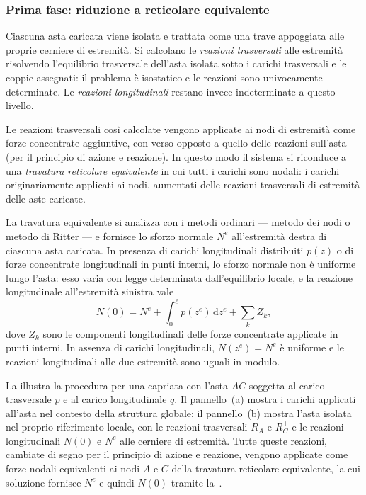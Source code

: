 \subsubsection{Prima fase: riduzione a reticolare equivalente}
\label{subsec:fase1_reticolare}

Ciascuna asta caricata viene isolata e trattata
come una trave appoggiata alle proprie cerniere di
estremità. Si calcolano le \emph{reazioni trasversali}
alle estremità risolvendo l'equilibrio trasversale
dell'asta isolata sotto i carichi trasversali e le
coppie assegnati: il problema è isostatico e le
reazioni sono univocamente determinate. Le
\emph{reazioni longitudinali} restano invece
indeterminate a questo livello.

Le reazioni trasversali così calcolate vengono
applicate ai nodi di estremità come forze concentrate
aggiuntive, con verso opposto a quello delle reazioni
sull'asta (per il principio di azione e reazione).
In questo modo il sistema si riconduce a una
\emph{travatura reticolare equivalente} in cui tutti
i carichi sono nodali: i carichi originariamente
applicati ai nodi, aumentati delle reazioni
trasversali di estremità delle aste caricate.

La travatura equivalente si analizza con i metodi
ordinari --- metodo dei nodi o metodo di Ritter ---
e fornisce lo sforzo normale $N^e$ all'estremità
destra di ciascuna asta caricata. In presenza di
carichi longitudinali distribuiti $p(z)$ o di
forze concentrate longitudinali in punti interni,
lo sforzo normale non è uniforme lungo l'asta:
esso varia con legge determinata dall'equilibrio
locale, e la reazione longitudinale all'estremità
sinistra vale
\begin{equation}\label{eq:reazione_long_sinistra}
	N(0) = N^e + \int_0^\ell p(z^e)\,\mathrm{d}z^e
	+ \sum_k Z_k,
\end{equation}
dove $Z_k$ sono le componenti longitudinali
delle forze concentrate applicate in punti interni.
In assenza di carichi longitudinali, $N(z^e) = N^e$
è uniforme e le reazioni longitudinali alle due
estremità sono uguali in modulo.

La  illustra la procedura
per una capriata con l'asta $AC$ soggetta al carico
trasversale $p$ e al carico longitudinale $q$.
Il pannello~(a) mostra i carichi applicati all'asta
nel contesto della struttura globale; il pannello~(b)
mostra l'asta isolata nel proprio riferimento locale,
con le reazioni trasversali $R_A^\perp$ e $R_C^\perp$
e le reazioni longitudinali $N(0)$ e $N^e$ alle
cerniere di estremità. Tutte queste reazioni,
cambiate di segno per il principio di azione e
reazione, vengono applicate come forze nodali
equivalenti ai nodi $A$ e $C$ della travatura
reticolare equivalente, la cui soluzione fornisce
$N^e$ e quindi $N(0)$ tramite
la~.



